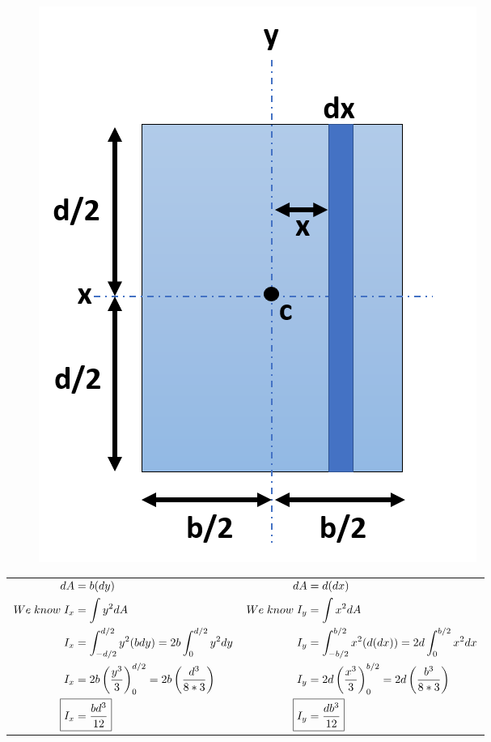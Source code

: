 \documentclass[8pt]{report}
\begin{document}
\begin{itemize}
\begin{figure}[H]
				\includegraphics[scale=0.35]{rectangleMOI_Iy.png}
			\end{figure}
		\end{itemize}
			\begin{table}[H]
				\centering
				\begin{tabular}{c|c}
					{$\begin{aligned}
					dA&=b(dy)\\
					We\;know\;I_x &= \int y^2dA\\
					I_x &= \int_{-d/2}^{d/2}y^2(bdy) = 2b\int_0^{d/2}y^2dy\\
					I_x &= 2b\left(\dfrac{y^3}{3}\right)_0^{d/2} = 2b\left(\dfrac{d^3}{8*3}\right)\\
					\Aboxed{I_x &= \dfrac{bd^3}{12}}
					\end{aligned}$}&
					
					{$\begin{aligned}
					dA &= d(dx)\\
					We\;know\;I_y &= \int x^2dA\\
					I_y &= \int_{-b/2}^{b/2}x^2(d(dx)) = 2d\int_{0}^{b/2}x^2dx \\
					I_y &= 2d\left(\dfrac{x^3}{3}\right)_0^{b/2} = 2d\left(\dfrac{b^3}{8*3}\right)\\
					\Aboxed{I_y &= \dfrac{db^3}{12}}
					\end{aligned}$}
				\end{tabular}
			\end{table}\hrulefill
\end{document}
